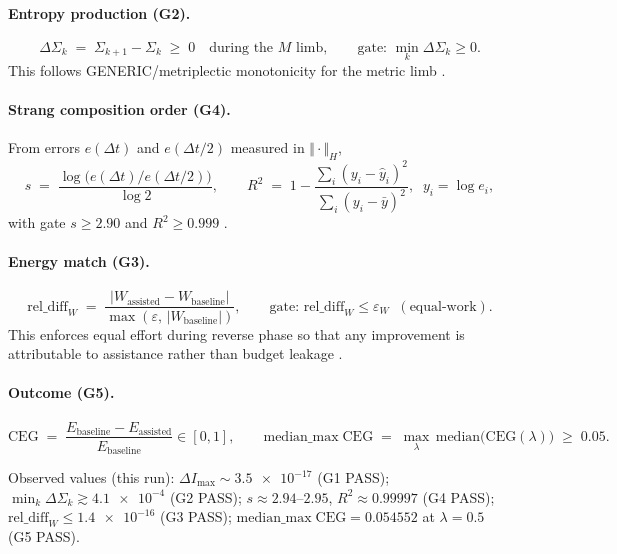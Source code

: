\documentclass{article}
\newcommand{\CEG}{\mathrm{CEG}}
\begin{document}
\paragraph{Entropy production (G2).}
\begin{equation}
  \Delta \Sigma_k \;=\; \Sigma_{k+1}-\Sigma_k \;\ge\; 0 \quad \text{during the $M$ limb},
  \qquad \text{gate: } \min_k \Delta \Sigma_k \ge 0.
\end{equation}
This follows GENERIC/metriplectic monotonicity for the metric limb \citep{OttingerGrmela1997I,GrmelaOttinger1997II,VDMCanonAxioms2025}.

\paragraph{Strang composition order (G4).}
From errors $e(\Delta t)$ and $e(\Delta t/2)$ measured in $\Vert\cdot\Vert_H$,
\begin{equation}
  s \;=\; \frac{\log\!\bigl(e(\Delta t)/e(\Delta t/2)\bigr)}{\log 2},
  \qquad
  R^2 \;=\; 1 - \frac{\sum_i (y_i-\hat{y}_i)^2}{\sum_i (y_i-\bar{y})^2}, \;\; y_i = \log e_i,
\end{equation}
with gate $s \ge 2.90$ and $R^2 \ge 0.999$ \citep{Strang1968}.

\paragraph{Energy match (G3).}
\begin{equation}
  \mathrm{rel\_diff}_W \;=\; \frac{\bigl| W_{\text{assisted}} - W_{\text{baseline}} \bigr|}{\max(\varepsilon,\,|W_{\text{baseline}}|)},
  \qquad \text{gate: } \mathrm{rel\_diff}_W \le \varepsilon_W \;\;(\text{equal‑work}).
\end{equation}
This enforces equal effort during reverse phase so that any improvement is attributable to assistance rather than budget leakage \citep{VDMCanonTierStandards2025}.

\paragraph{Outcome (G5).}
\begin{equation}
  \CEG \;=\; \frac{E_{\mathrm{baseline}}-E_{\mathrm{assisted}}}{E_{\mathrm{baseline}}}\in[0,1],
  \qquad
  \mathrm{median\_max\;\CEG} \;=\; \max_{\lambda}\,\mathrm{median}\bigl(\CEG(\lambda)\bigr) \;\ge\; 0.05.
\end{equation}

Observed values (this run): $\Delta I_{\max}\sim \num{3.5e-17}$ (G1 PASS); $\min_k \Delta\Sigma_k \gtrsim \num{4.1e-4}$ (G2 PASS); $s\approx 2.94$–$2.95$, $R^2\approx \num{0.99997}$ (G4 PASS); $\mathrm{rel\_diff}_W \le \num{1.4e-16}$ (G3 PASS); $\mathrm{median\_max\;CEG}=\num{0.054552}$ at $\lambda=0.5$ (G5 PASS).
\end{document}
